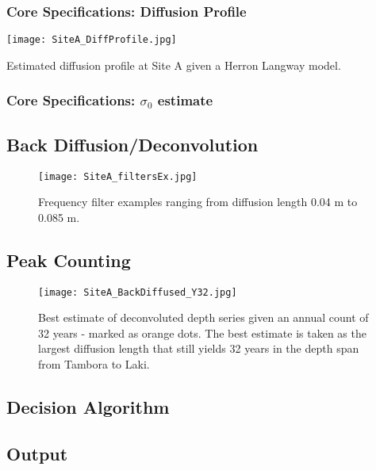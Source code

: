 \documentclass[../../CompleteThesis/Complete_1stDraft.tex]{subfiles}
\begin{document}
\subsubsection[Diffusion Profile]{Core Specifications: Diffusion Profile}
\begin{marginfigure}
	\centering
	\texttt{[image: SiteA\_DiffProfile.jpg]}
	\caption[Diffusion profile, Site A.]{\footnotesize{Estimated diffusion profile at Site A given a Herron Langway model.}}
	\label{fig:SiteADiffProfile}
\end{marginfigure}

\subsubsection[$\sigma_0$ estimate]{Core Specifications: $\sigma_0$ estimate}

\subsection[Back Diffusion]{Back Diffusion/Deconvolution}
\begin{figure}[h]
	\centering
	\texttt{[image: SiteA\_filtersEx.jpg]}
	\caption[Frequency filters example, Site A]{Frequency filter examples ranging from diffusion length 0.04 m to 0.085 m.}
	\label{fig:SiteA_filtersEx}
\end{figure}

\subsection[Peak Counting]{Peak Counting}

\begin{figure}
	\centering
	\texttt{[image: SiteA\_BackDiffused\_Y32.jpg]}
	\caption[Best estimate of deconvoluted depth series, Site A]{Best estimate of deconvoluted depth series given an annual count of 32 years - marked as orange dots. The best estimate is taken as the largest diffusion length that still yields 32 years in the depth span from Tambora to Laki.}
	\label{fig:SiteA_BackDiffused_Y32}
\end{figure}

\subsection[Decision algorithm]{Decision Algorithm}

\subsection[Output]{Output}
\end{document}
